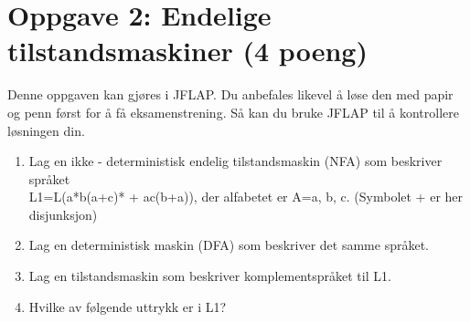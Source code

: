 \documentclass[a4paper, 12pt,]{article}             %
\begin{document}
\section*{Oppgave 2: Endelige tilstandsmaskiner (4 poeng)}
Denne oppgaven kan gjøres i JFLAP. Du anbefales likevel å løse den med papir og penn først for å få 
eksamenstrening. Så kan du bruke JFLAP til å kontrollere løsningen din.
\begin{enumerate}
  \item Lag en ikke - deterministisk endelig tilstandsmaskin (NFA) som beskriver språket\\  
    L1=L(a*b(a+c)* + ac(b+a)), der alfabetet er A={a, b, c}. (Symbolet + er her disjunksjon)
  \item Lag en deterministisk maskin (DFA) som beskriver det samme språket. 
  \item Lag en tilstandsmaskin som beskriver komplementspråket til L1. 
  \item Hvilke av følgende uttrykk er i L1?
  \end{enumerate}
   
  \clearpage
\end{document}
